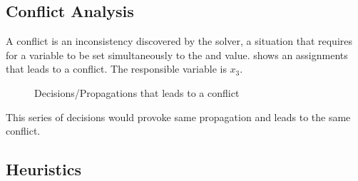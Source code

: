 %
%
%
%


\subsection{Conflict Analysis}
A conflict is an inconsistency discovered by the solver, a situation that requires for a variable to be set 
simultaneously to the \true and \false value.  shows an assignments that leads to a conflict.
The responsible variable is $x_3$. 
 
\begin{figure}[H]
	
	\caption{Decisions/Propagations that leads to a  conflict}
	\label{fig:conflict}
\end{figure}

This series of decisions would provoke same propagation and leads to the same conflict. 




\subsection{Heuristics}

